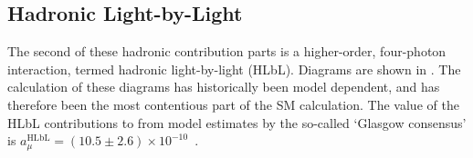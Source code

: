 


\subsection*{Hadronic Light-by-Light}
\label{subsec:HLbL}

The second of these hadronic contribution parts is a higher-order, four-photon interaction, termed hadronic light-by-light (HLbL). Diagrams are shown in . The calculation of these diagrams has historically been model dependent, and has therefore been the most contentious part of the SM calculation. The value of the HLbL contributions to \amu from model estimates by the so-called `Glasgow consensus' is $a_{\mu}^{\text{HLbL}} = (10.5 \pm 2.6) \times 10^{-10}$~\cite{Prades:2009tw}.




